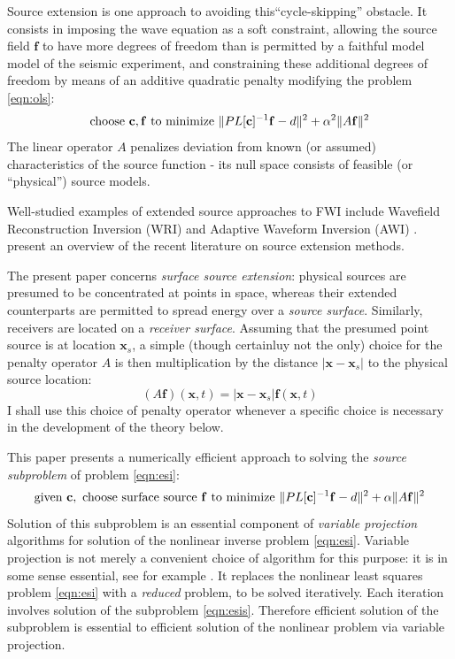 \documentclass[12pt]{geophysics}
\newcommand{\bx}{\mathbf{x}}
\newcommand{\bff}{\mathbf{f}}
\begin{document}
Source extension is one approach to avoiding this``cycle-skipping''
obstacle. It consists in imposing the wave equation as a soft
constraint, allowing the source field $\bff$ to have more degrees of
freedom than is permitted by a faithful model model of the seismic
experiment, and constraining these additional degrees of freedom by
means of an additive quadratic penalty modifying the problem
\ref{eqn:ols}:
\begin{equation}
\label{eqn:esi}
\mbox{choose } {\bf c}, \bff \mbox{ to minimize } \|PL[{\bf c}]^{-1}\bff -d \|^2 + \alpha^2 \|A\bff\|^2 
\end{equation}
The linear operator $A$ penalizes deviation from known (or assumed)
characteristics of the source function - its null space consists of
feasible (or ``physical'') source models.

Well-studied examples of extended source approaches to FWI include
Wavefield Reconstruction Inversion (WRI)  \cite[]{LeeuwenHerrmannWRI:13,LeeuwenHerrmann:16,Lietal:18,Aghmiryetal:20,Louboutinetal:20} and Adaptive Waveform
Inversion (AWI)
\cite[]{Warner:16,GuachWarnerRavaut:GEO19,Guaschetal:NPJDM20,Yongetal:EAGE21,Warneretal:SEG21}. \cite{HuangNammourSymesDollizal:SEG19}
present an overview of the recent
literature on source extension methods.

The present paper concerns {\em surface source extension}: physical
sources are presumed to be concentrated at points in space, whereas
their extended counterparts are permitted to spread energy over a {\em
  source surface}. Similarly, receivers are located on a {\em receiver
  surface}. Assuming that the presumed point source is at location
$\bx_s$, a simple (though certainluy not the only) choice for the
penalty operator $A$ is then multiplication by the distance
$|\bx-\bx_s|$ to the physical source location:
\begin{equation}
  \label{eqn:penop}
  (A\bff)(\bx,t) = |\bx-\bx_s|\bff(\bx,t)
\end{equation}
I shall use this choice of penalty operator whenever a specific choice
is necessary in the development of the theory below.

This paper presents a numerically efficient approach to solving the
{\em source subproblem} of problem \ref{eqn:esi}:
\begin{equation}
\label{eqn:esis}
\mbox{given } {\bf c}, \mbox{ choose surface source } \bff \mbox{ to minimize }
\|PL[{\bf c}]^{-1}\bff -d \|^2 + \alpha \|A\bff\|^2 
\end{equation}
Solution of this subproblem is an essential component of {\em variable
  projection} algorithms for solution of the nonlinear inverse problem
\ref{eqn:esi}. Variable projection is not merely a convenient choice
of algorithm for this purpose: it is in some sense essential, see for
example \cite{Symes:SEG20}. It replaces the nonlinear
least squares problem \ref{eqn:esi} with a {\em reduced} problem, to
be solved iteratively. Each iteration involves solution of the
subproblem \ref{eqn:esis}. Therefore efficient solution of the
subproblem is essential to efficient solution of the nonlinear problem
via variable projection.
\end{document}
